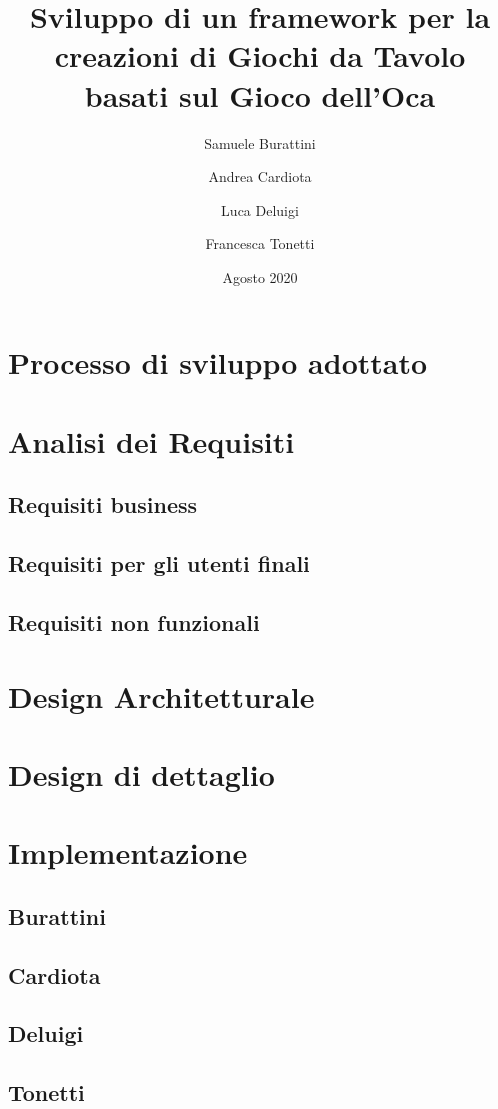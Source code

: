 \documentclass{book}
\title{
    Sviluppo di un framework per la creazioni di Giochi da Tavolo basati sul Gioco dell'Oca}
\author{
    Samuele Burattini \\ \emailaddr{samuele.burattini@studio.unibo.it}
    \and 
    Andrea Cardiota \\ \emailaddr{andrea.cardiota@studio.unibo.it} 
    \and 
    Luca Deluigi \\ \emailaddr{luca.deluigi3@studio.unibo.it}
    \and
    Francesca Tonetti \\ \emailaddr{francesca.tonetti@studio.unibo.it}
}
\date{Agosto 2020}
\begin{document}
\maketitle


\chapter{Processo di sviluppo adottato}

\chapter{Analisi dei Requisiti}

\section{Requisiti business}

\section{Requisiti per gli utenti finali}

\section{Requisiti non funzionali}

\chapter{Design Architetturale}

\chapter{Design di dettaglio}


\chapter{Implementazione}
\section{Burattini}
\section{Cardiota}
\section{Deluigi}
\section{Tonetti}
\end{document}
